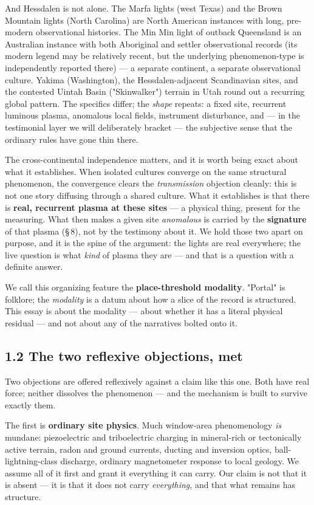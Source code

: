 \documentclass[11pt]{article}
\begin{document}
And Hessdalen is not alone. The Marfa lights (west Texas) and the Brown Mountain lights (North Carolina) are North American instances with long, pre-modern observational histories. The Min Min light of outback Queensland is an Australian instance with both Aboriginal and settler observational records (its modern legend may be relatively recent, but the underlying phenomenon-type is independently reported there) --- a separate continent, a separate observational culture. Yakima (Washington), the Hessdalen-adjacent Scandinavian sites, and the contested Uintah Basin ("Skinwalker") terrain in Utah round out a recurring global pattern. The specifics differ; the \emph{shape} repeats: a fixed site, recurrent luminous plasma, anomalous local fields, instrument disturbance, and --- in the testimonial layer we will deliberately bracket --- the subjective sense that the ordinary rules have gone thin there.

The cross-continental independence matters, and it is worth being exact about what it establishes. When isolated cultures converge on the same structural phenomenon, the convergence clears the \emph{transmission} objection cleanly: this is not one story diffusing through a shared culture. What it establishes is that there is \textbf{real, recurrent plasma at these sites} --- a physical thing, present for the measuring. What then makes a given site \emph{anomalous} is carried by the \textbf{signature} of that plasma (\S\,8), not by the testimony about it. We hold those two apart on purpose, and it is the spine of the argument: the lights are real everywhere; the live question is what \emph{kind} of plasma they are --- and that is a question with a definite answer.

We call this organizing feature the \textbf{place-threshold modality}. "Portal" is folklore; the \emph{modality} is a datum about how a slice of the record is structured. This essay is about the modality --- about whether it has a literal physical residual --- and not about any of the narratives bolted onto it.

\subsection*{1.2 The two reflexive objections, met}
Two objections are offered reflexively against a claim like this one. Both have real force; neither dissolves the phenomenon --- and the mechanism is built to survive exactly them.

The first is \textbf{ordinary site physics}. Much window-area phenomenology \emph{is} mundane: piezoelectric and triboelectric charging in mineral-rich or tectonically active terrain, radon and ground currents, ducting and inversion optics, ball-lightning-class discharge, ordinary magnetometer response to local geology. We assume all of it first and grant it everything it can carry. Our claim is not that it is absent --- it is that it does not carry \emph{everything}, and that what remains has structure.
\end{document}
